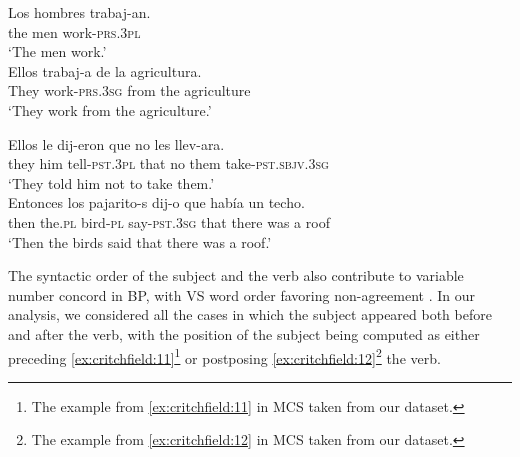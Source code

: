 \documentclass[output=paper,colorlinks,citecolor=brown,
]{langscibook}
\begin{document}
\begin{exe} %
    \ex\label{ex:critchfield:9} 
    \begin{xlist} 
        \ex \label{ex:critchfield:9a}
            \gll Los hombres   trabaj-an.\\  
            the  men         work-\textsc{prs}.\textsc{3pl}\\
            \glt `The men work.'\\
        \ex\label{ex:critchfield:9b}
            \gll Ellos  trabaj-a   de      la  agricultura.\\
             They  work-\textsc{prs}.\textsc{3sg}    from the  agriculture\\
            \glt  `They work from the agriculture.'
\end{xlist}
\end{exe}


\begin{exe} %
    \ex\label{ex:critchfield:10} 
    \begin{xlist} 
        \ex \label{ex:critchfield:10a}
            \gll Ellos   le      dij-eron             que    no    les        llev-ara.\\  
            they   him    tell-\textsc{pst}.\textsc{3pl}   that    no    them     take-\textsc{pst}.\textsc{sbjv}.\textsc{3sg}\\
            \glt `They told him not to take them.'\\
        \ex\label{ex:critchfield:10b}
            \gll Entonces  los         pajarito-s    dij-o                 que    había         un   techo.\\
            then the.\textsc{pl}   bird-\textsc{pl} say-\textsc{pst}.\textsc{3sg} that  {there was}   a  roof\\
            \glt  `Then the birds said that there was a roof.'
\end{xlist}
\end{exe}

The syntactic order of the subject and the verb also contribute to variable number concord in BP, with VS word order favoring non-agreement \citep[363]{mendes2015variable}. In our analysis, we considered all the cases in which the subject appeared both before and after the verb, with the position of the subject being computed as either preceding \ref{ex:critchfield:11}\footnote{The example from \ref{ex:critchfield:11} in MCS taken from our dataset.} or postposing \ref{ex:critchfield:12}\footnote{The example from \ref{ex:critchfield:12} in MCS taken from our dataset.} the verb. 
\end{document}

